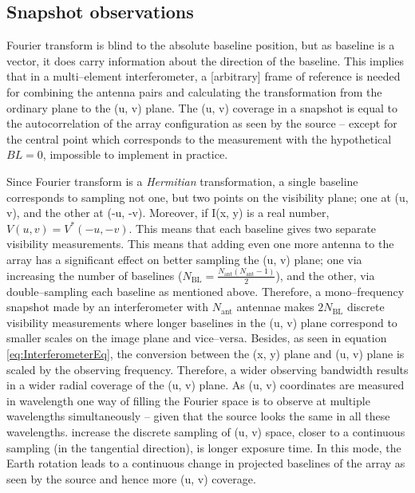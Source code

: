 \documentclass[a4wide,12pt]{book}
\begin{document}
\subsection*{Snapshot observations}
Fourier transform is blind to the absolute baseline position, but as baseline is a vector, it does carry information about the direction of the baseline. This implies that in a multi--element interferometer, a [arbitrary] frame of reference is needed for combining the antenna pairs and calculating the transformation from the ordinary plane to the (u, v) plane. The (u, v) coverage in a snapshot is equal to the autocorrelation of the array configuration as seen by the source -- except for the central point which corresponds to the measurement with the hypothetical $BL = 0$, impossible to implement in practice.

Since Fourier transform is a \emph{Hermitian} transformation, a single baseline corresponds to sampling not one, but two points on the visibility plane; one at (u, v), and the other at (-u, -v). Moreover, if I(x, y) is a real number, $V(u, v) = V^*(-u, -v)$. This means that each baseline gives two separate visibility measurements. This means that adding even one more antenna to the array has a significant effect on better sampling the (u, v) plane; one via increasing the number of baselines ($N_\mathrm{BL} = \frac{N_\mathrm{ant}(N_\mathrm{ant}-1)}{2}$), and the other, via double--sampling each baseline as mentioned above. Therefore, a mono--frequency snapshot made by an interferometer with $N_\mathrm{ant}$ antennae makes $2N_\mathrm{BL}$ discrete visibility measurements where longer baselines in the (u, v) plane correspond to smaller scales on the image plane and vice--versa. Besides, as seen in equation \ref{eq:InterferometerEq}, the conversion between the (x, y) plane and (u, v) plane is scaled by the observing frequency. Therefore, a wider observing bandwidth results in a wider radial coverage of the (u, v) plane. As (u, v) coordinates are measured in wavelength one way of filling the Fourier space is to observe at multiple wavelengths simultaneously -- given that the source looks the same in all these wavelengths. increase the discrete sampling of (u, v) space, closer to a continuous sampling (in the tangential direction), is longer exposure time. In this mode, the Earth rotation leads to a continuous change in projected baselines of the array as seen by the source and hence more (u, v) coverage.
\end{document}
